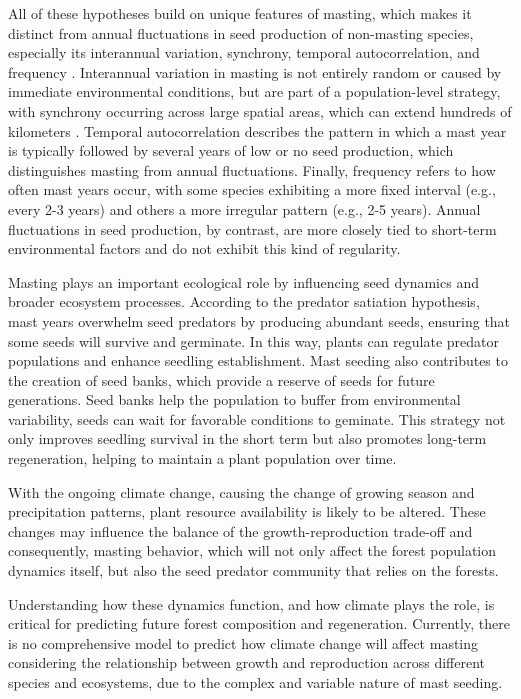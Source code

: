 \documentclass[11pt,letter]{article}
\begin{document}
All of these hypotheses build on unique features of masting, which makes it distinct from annual fluctuations in seed production of non-masting species, especially its interannual variation, synchrony, temporal autocorrelation, and frequency \citep{hacket2021climate}. Interannual variation in masting is not entirely random or caused by immediate environmental conditions, but are part of a population-level strategy, with synchrony occurring across large spatial areas, which can extend hundreds of kilometers \citep{kelly1994evolutionary}. Temporal autocorrelation describes the pattern in which a mast year is typically followed by several years of low or no seed production, which distinguishes masting from annual fluctuations. Finally, frequency refers to how often mast years occur, with some species exhibiting a more fixed interval (e.g., every 2-3 years) and others a more irregular pattern (e.g., 2-5 years). Annual fluctuations in seed production, by contrast, are more closely tied to short-term environmental factors and do not exhibit this kind of regularity. \par
Masting plays an important ecological role by influencing seed dynamics and broader ecosystem processes. According to the predator satiation hypothesis, mast years overwhelm seed predators by producing abundant seeds, ensuring that some seeds will survive and germinate. In this way, plants can regulate predator populations and enhance seedling establishment. Mast seeding also contributes to the creation of seed banks, which provide a reserve of seeds for future generations. Seed banks help the population to buffer from environmental variability, seeds can wait for favorable conditions to geminate. This strategy not only improves seedling survival in the short term but also promotes long-term regeneration, helping to maintain a plant population over time.\par
With the ongoing climate change, causing the change of growing season and precipitation patterns, plant resource availability is likely to be altered. These changes may influence the balance of the growth-reproduction trade-off and consequently, masting behavior, which will not only affect the forest population dynamics itself, but also the seed predator community that relies on the forests. \par
Understanding how these dynamics function, and how climate plays the role, is critical for predicting future forest composition and regeneration. Currently, there is no comprehensive model to predict how climate change will affect masting considering the relationship between growth and reproduction across different species and ecosystems, due to the complex and variable nature of mast seeding.\par
\end{document}
